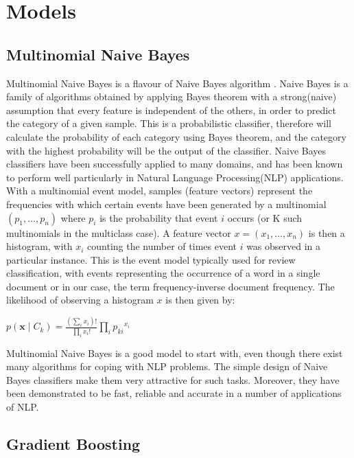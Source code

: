 \documentclass[letterpaper, 10 pt, conference]{ieeeconf}  %
\begin{document}
\section{Models}

\subsection{Multinomial Naive Bayes}

{Multinomial Naive Bayes} is a flavour of {Naive Bayes algorithm} \cite{c10}. Naive Bayes is a family of algorithms obtained by applying Bayes theorem with a strong(naive) assumption that every feature is independent of the others, in order to predict the category of a given sample. This is a probabilistic classifier, therefore will calculate the probability of each category using Bayes theorem, and the category with the highest probability will be the output of the classifier. Naive Bayes classifiers have been successfully applied to many domains, and has been known to perform well particularly in Natural Language Processing(NLP) applications. \\

With a multinomial event model, samples (feature vectors) represent the frequencies with which certain events have been generated by a multinomial $( p_1 , \dots , p_n )$ where $p_i$ is the probability that event $i$ occurs (or K such multinomials in the multiclass case). A feature vector ${x} =(x_{1},\dots ,x_{n})$ is then a histogram, with $x_{i}$ counting the number of times event $i$ was observed in a particular instance. This is the event model typically used for review classification, with events representing the occurrence of a word in a single document or in our case, the term frequency-inverse document frequency. The likelihood of observing a histogram $x$ is then given by:
\begin{center}
  ${\displaystyle p(\mathbf {x} \mid C_{k})={\frac {(\sum _{i}x_{i})!}{\prod _{i}x_{i}!}}\prod _{i}{p_{ki}}^{x_{i}}}$\\  
\end{center}

Multinomial Naive Bayes is a good model to start with, even though there exist many algorithms for coping with NLP problems. The simple design of Naive Bayes classifiers make them very attractive for such tasks. Moreover, they have been demonstrated to be fast, reliable and accurate in a number of applications of NLP. 

\subsection{Gradient Boosting}
\end{document}

